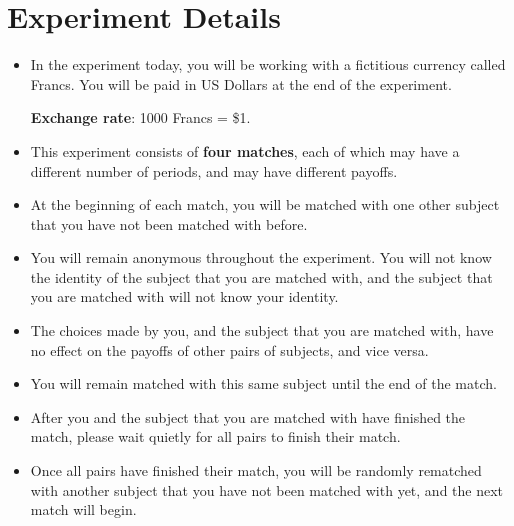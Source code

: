 \documentclass[11pt]{article}
\newcommand{\dblbkt}[1]{}
\begin{document}
\section*{\dblbkt{3} Experiment Details} 
\begin{itemize} 
\item In the experiment today, you will be working with a fictitious currency called Francs. You will be paid in US Dollars at the end of the experiment.
\begin{center} 
\dblbkt{1}{\bf Exchange rate}: 1000 Francs = \$1.
\end{center} 

\item  This experiment consists of \dblbkt{1}{\bf four matches}, each of which may have a different number of periods, and may have different payoffs.  
\item At the beginning of each match, \dblbkt{1} you will be matched with one other subject that you have not been matched with before. 
\item You will remain \dblbkt{1} anonymous throughout the experiment.  You will not know the identity of the subject that you are matched with, and the subject that you are matched with will not know your identity.  
\item The choices made by you, and the subject that you are matched with, have no effect on the payoffs of other pairs of subjects, and vice versa.
\item You will remain matched with this \dblbkt{1} same subject until the end of the match.  
\item After you and the subject that you are matched with have finished the match, please wait quietly for all pairs to finish their match.  
\item Once all pairs have finished their match, you will be \dblbkt{1} randomly rematched with another subject that you have not been matched with yet, and the next match will begin.  
\end{itemize}
\end{document}
